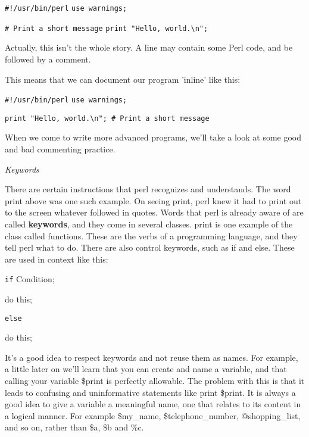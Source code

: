 \documentclass[a4paper,11pt]{book}
\begin{document}
\noindent 

\noindent \texttt{\#!/usr/bin/perl}
\noindent \texttt{use warnings;}

\noindent 

\noindent \texttt{\# Print a short message}
\noindent \texttt{print "Hello, world.\textbackslash n";}

\noindent 

\noindent 

\noindent Actually, this isn't the whole story. A line may contain some Perl code, and be followed by a comment.

\noindent This means that we can document our program 'inline' like this:

\noindent 

\noindent 

\noindent \texttt{\#!/usr/bin/perl}
\noindent \texttt{use warnings;}

\noindent 

\noindent \texttt{print "Hello, world.\textbackslash n"; \# Print a short message}

\noindent 

\noindent When we come to write more advanced programs, we'll take a look at some good and bad commenting practice.

\noindent 

\noindent \textit{Keywords}

\noindent There are certain instructions that perl recognizes and understands. The word print above was one such example. On seeing print, perl knew it had to print out to the screen whatever followed in quotes. Words that perl is already aware of are called \textbf{keywords}, and they come in several classes. print is one example of the class called functions. These are the verbs of a programming language, and they tell perl what to do. There are also control keywords, such as if and else. These are used in context like this:

\noindent 

\noindent \texttt{if} Condition;

\noindent do this;

\noindent 

\noindent \texttt{else}

\noindent do this;

\noindent 

\noindent It's a good idea to respect keywords and not reuse them as names. For example, a little later on we'll learn that you can create and name a variable, and that calling your variable \$print is perfectly allowable. The problem with this is that it leads to confusing and uninformative statements like print \$print. It is always a good idea to give a variable a meaningful name, one that relates to its content in a logical manner. For example \$my\_name, \$telephone\_number, @shopping\_list, and so on, rather than \$a, \$b and \%c.
\end{document}
